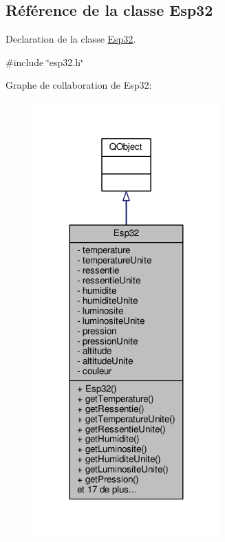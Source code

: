 \hypertarget{class_esp32}{}\subsection{Référence de la classe Esp32}
\label{class_esp32}


Declaration de la classe \hyperlink{class_esp32}{Esp32}.  




{\ttfamily \#include \char`\"{}esp32.\+h\char`\"{}}



Graphe de collaboration de Esp32\+:\nopagebreak
\begin{figure}[H]
\begin{center}
\leavevmode
\includegraphics[width=203pt]{class_esp32__coll__graph}
\end{center}
\end{figure}
